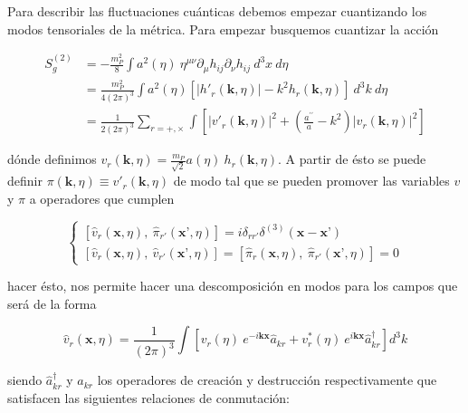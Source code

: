 Para describir las fluctuaciones cuánticas debemos empezar cuantizando los modos tensoriales de la métrica. Para empezar busquemos cuantizar la acción

\begin{equation*}
    \begin{split} 
        S^{(2)}_g &= - \frac{m_P^2}{8} \int a^2 (\eta) \ \eta^{\mu \nu} \partial_\mu h_{ij} \partial_\nu h_{ij} \ d^3 x \ d\eta\\
        &= \frac{m^2_P}{4 (2 \pi)^3} \int a^2 (\eta) \left[ \left| h'_r (\textbf{k}, \eta) \right| - k^2 h_r (\textbf{k}, \eta) \right] \ d^3 k \ d \eta\\
        &= \frac{1}{2 (2 \pi)^3} \sum_{r = +, \times} \int \left[ \left| v'_r (\textbf{k}, \eta) \right|^2 + \left( \frac{a^{\prime \prime}}{a} - k^2 \right) \left| v_r (\textbf{k}, \eta) \right|^2 \right] 
    \end{split}
\end{equation*}

\noindent
dónde definimos $\displaystyle v_r (\textbf{k},\eta) = \frac{m_P}{\sqrt{2}} a (\eta) \ h_r (\textbf{k}, \eta)$. A partir de ésto se puede definir $\displaystyle \pi (\textbf{k}, \eta) \equiv v'_r (\textbf{k}, \eta)$ de modo tal que se pueden promover las variables $v$ y $\pi$ a operadores que cumplen 

\begin{equation}
    \begin{cases}
        \displaystyle \left[ \hat{v}_r (\textbf{x}, \eta), \ \hat{\pi}_{r'} (\textbf{x'}, \eta) \right] = i \delta_{rr'} \delta^{(3)} (\textbf{x} - \textbf{x'})\\
        \displaystyle \left[ \hat{v}_r (\textbf{x}, \eta), \ \hat{v}_{r'} (\textbf{x'}, \eta) \right] = \left[ \hat{\pi}_r (\textbf{x}, \eta), \ \hat{\pi}_{r'} (\textbf{x'}, \eta) \right] = 0
    \end{cases}
\end{equation}

\noindent
hacer ésto, nos permite hacer una descomposición en modos para los campos que será de la forma

\begin{equation}
    \hat{v}_r (\textbf{x}, \eta) = \frac{1}{(2 \pi)^3} \int \left[ v_r (\eta) \ e^{-i \textbf{kx}} \hat{a}_{kr} + v^*_r (\eta) \ e^{i \textbf{kx}} \hat{a}^\dagger_{kr} \right] d^3 k 
\end{equation}

\noindent
siendo $\hat{a}_{kr}^\dagger$ y  $\hat{a}_{kr}$ los operadores de creación y destrucción respectivamente que satisfacen las siguientes relaciones de conmutación:

